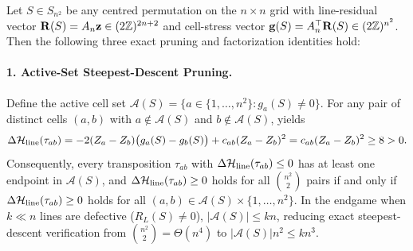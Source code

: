 \begin{theorem}
\label{thm:bilinear_plaquette}
Let $S \in S_{n^2}$ be any centred permutation on the $n\times n$ grid with line-residual vector $\mathbf{R}(S) = A_n \mathbf{z} \in (2\mathbb{Z})^{2n+2}$ and cell-stress vector $\mathbf{g}(S) = A_n^\top \mathbf{R}(S) \in (2\mathbb{Z})^{n^2}$. Then the following three exact pruning and factorization identities hold:

\paragraph{1. Active-Set Steepest-Descent Pruning.}
Define the active cell set $\mathcal{A}(S) = \{a \in \{1,\dots,n^2\} : g_a(S) \ne 0\}$. For any pair of distinct cells $(a,b)$ with $a \notin \mathcal{A}(S)$ and $b \notin \mathcal{A}(S)$,  yields
\begin{equation}
  \Delta\mathcal{H}_{\mathrm{line}}(\tau_{ab}) = -2(Z_a - Z_b)\bigl(g_a(S) - g_b(S)\bigr) + c_{ab}(Z_a - Z_b)^2 = c_{ab}(Z_a - Z_b)^2 \ge 8 > 0.
  \label{eq:active_set_positivity}
\end{equation}
Consequently, every transposition $\tau_{ab}$ with $\Delta\mathcal{H}_{\mathrm{line}}(\tau_{ab}) \le 0$ has at least one endpoint in $\mathcal{A}(S)$, and $\Delta\mathcal{H}_{\mathrm{line}}(\tau_{ab}) \ge 0$ holds for all $\binom{n^2}{2}$ pairs if and only if $\Delta\mathcal{H}_{\mathrm{line}}(\tau_{ab}) \ge 0$ holds for all $(a,b) \in \mathcal{A}(S) \times \{1,\dots,n^2\}$. In the endgame when $k \ll n$ lines are defective ($R_L(S) \ne 0$), $|\mathcal{A}(S)| \le k n$, reducing exact steepest-descent verification from $\binom{n^2}{2} = \Theta(n^4)$ to $|\mathcal{A}(S)|n^2 \le k n^3$.


\end{theorem}
